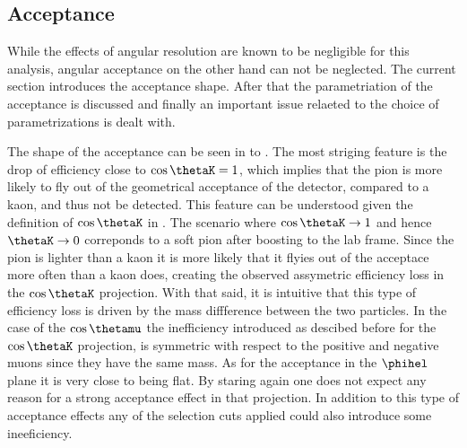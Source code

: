 \subsection{Acceptance}
\label{Accceptance}
While the effects of angular resolution are known to be negligible for this analysis, angular acceptance on the other hand can
not be neglected. The current section introduces the acceptance shape. After that the parametriation of the acceptance is discussed
and finally an important issue relaeted to the choice of parametrizations is dealt with.

The shape of the acceptance can be seen in  to . The most striging feature is the drop of efficiency 
close to $\cos\thetaK=1$, which implies that the pion is more likely to fly out of the geometrical acceptance of the detector, compared to a kaon,
and thus not be detected. This feature can be understood given the  definition of $\cos\thetaK$ in . 
The scenario where $\cos\thetaK\rightarrow 1$ and hence $\thetaK \rightarrow 0$ correponds to a soft pion after boosting
to the lab frame. Since the pion is lighter than a kaon it is more likely that it flyies out of the acceptace more
often than a kaon does, creating the observed assymetric efficiency loss in the $\cos\thetaK$ projection. With that said, it is intuitive that
this type of efficiency loss is driven by the mass diffference between the two particles. In the case of the $\cos\thetamu$ the
inefficiency introduced as descibed before for the $\cos\thetaK$ projection, is symmetric with respect to the positive and negative muons since 
they have the same mass. As for the acceptance in the $\phihel$ plane it is very close to being flat. By staring again  one does not expect any
reason for a strong acceptance effect in that projection. In addition to this type of acceptance effects any of the selection 
cuts applied could also introduce some ineeficiency.  

